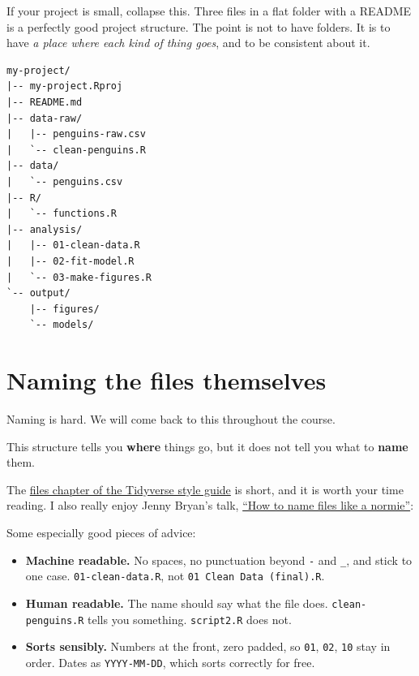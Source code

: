 \documentclass[
  letterpaper,
  justified,
  a4paper]{tufte-book}
\providecommand{\tightlist}{%
  \setlength{\itemsep}{0pt}\setlength{\parskip}{0pt}}
\providecommand{\tightlist}{%
  \setlength{\itemsep}{0pt}\setlength{\parskip}{0pt}}
\begin{document}
If your project is small, collapse this. Three files in a flat folder
with a README is a perfectly good project structure. The point is not to
have folders. It is to have \emph{a place where each kind of thing
goes}, and to be consistent about it.

\begin{tcolorbox}[enhanced jigsaw, arc=.35mm, bottomrule=.15mm, bottomtitle=1mm, breakable, colback=white, colbacktitle=quarto-callout-tip-color!10!white, colframe=quarto-callout-tip-color-frame, coltitle=black, left=2mm, leftrule=.75mm, opacityback=0, opacitybacktitle=0.6, rightrule=.15mm, title=\textcolor{quarto-callout-tip-color}{\faLightbulb}\hspace{0.5em}{The same structure as text, if you want to copy it}, titlerule=0mm, toprule=.15mm, toptitle=1mm]

\begin{verbatim}
my-project/
|-- my-project.Rproj
|-- README.md
|-- data-raw/
|   |-- penguins-raw.csv
|   `-- clean-penguins.R
|-- data/
|   `-- penguins.csv
|-- R/
|   `-- functions.R
|-- analysis/
|   |-- 01-clean-data.R
|   |-- 02-fit-model.R
|   `-- 03-make-figures.R
`-- output/
    |-- figures/
    `-- models/
\end{verbatim}

\end{tcolorbox}

\section{Naming the files themselves}\label{naming-the-files-themselves}

Naming is hard. We will come back to this throughout the course.

This structure tells you \textbf{where} things go, but it does not tell
you what to \textbf{name} them.

The \href{https://style.tidyverse.org/files.html}{files chapter of the
Tidyverse style guide} is short, and it is worth your time reading. I
also really enjoy Jenny Bryan's talk,
\href{https://github.com/jennybc/how-to-name-files}{``How to name files
like a normie''}:

Some especially good pieces of advice:

\begin{itemize}
\tightlist
\item
  \textbf{Machine readable.} No spaces, no punctuation beyond \texttt{-}
  and \texttt{\_}, and stick to one case. \texttt{01-clean-data.R}, not
  \texttt{01\ Clean\ Data\ (final).R}.
\item
  \textbf{Human readable.} The name should say what the file does.
  \texttt{clean-penguins.R} tells you something. \texttt{script2.R} does
  not.
\item
  \textbf{Sorts sensibly.} Numbers at the front, zero padded, so
  \texttt{01}, \texttt{02}, \texttt{10} stay in order. Dates as
  \texttt{YYYY-MM-DD}, which sorts correctly for free.
\end{itemize}
\end{document}
